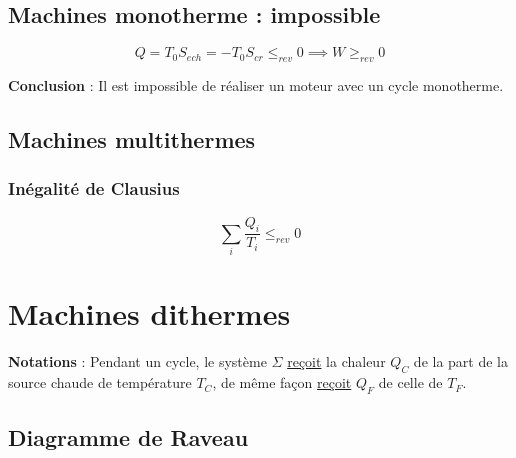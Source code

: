\subsection{Machines monotherme : impossible} %
\label{sub:Machines monotherme : impossible}

\begin{equation}
  Q = T_0 S _{ech} = - T_0 S _{cr} \le _{rev} 0 \implies W \ge _{rev} 0
\end{equation}

\textbf{Conclusion} : Il est impossible de réaliser un moteur avec un cycle monotherme.

\subsection{Machines multithermes} %
\label{sub:Machines multithermes}

\subsubsection{Inégalité de Clausius} %
\label{sec:Inégalité de Clausius}

\begin{equation}
  \sum_{i}^{} \frac{Q_i}{T_i}  \le _{rev} 0
\end{equation}

\newpage
\section{Machines dithermes} %
\label{sec:Machines dithermes}

\begin{tcolorbox}
  \textbf{Notations} : Pendant un cycle, le système $\Sigma$ \underline{reçoit} la chaleur $Q_C$ de la part de la source chaude de température $T_C$, de même façon \underline{reçoit} $Q_F$ de celle de $T_F$.
\end{tcolorbox}
\subsection{Diagramme de Raveau} %
\label{sub:Diagramme de Raveau}

